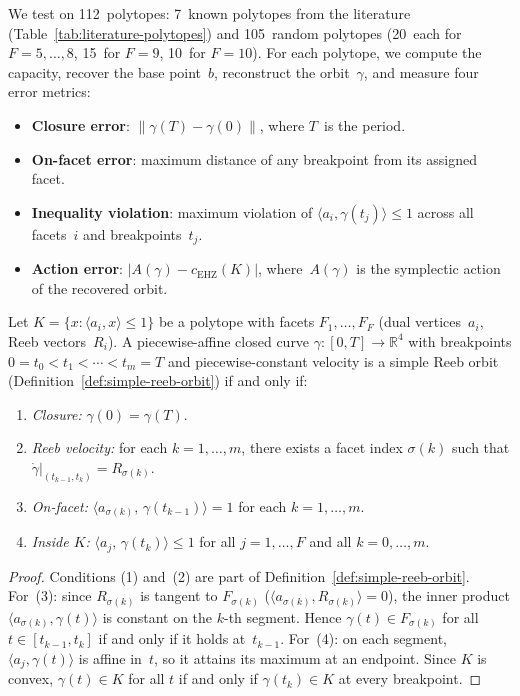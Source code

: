 We test on 112~polytopes: 7~known polytopes from the literature
(Table~\ref{tab:literature-polytopes}) and 105~random polytopes
(20~each for $F = 5, \ldots, 8$, 15~for $F = 9$, 10~for $F = 10$).
For each polytope, we compute the capacity, recover the base
point~$b$, reconstruct the orbit~$\gamma$, and measure four error
metrics:
\begin{itemize}
  \item \textbf{Closure error}: $\lVert \gamma(T) - \gamma(0) \rVert$,
    where $T$~is the period.
  \item \textbf{On-facet error}: maximum distance of any breakpoint
    from its assigned facet.
  \item \textbf{Inequality violation}: maximum violation of
    $\langle a_i, \gamma(t_j) \rangle \le 1$ across all facets~$i$
    and breakpoints~$t_j$.
  \item \textbf{Action error}: $\lvert A(\gamma) - c_{\mathrm{EHZ}}(K) \rvert$,
    where~$A(\gamma)$ is the symplectic action of the recovered orbit.
\end{itemize}
\begin{lemma}%
\label{lem:finite-orbit-verification}
Let $K = \{x : \langle a_i, x \rangle \le 1\}$ be a polytope with
facets $F_1, \ldots, F_F$ (dual vertices~$a_i$, Reeb vectors~$R_i$).
A piecewise-affine closed curve $\gamma \colon [0, T] \to \mathbb{R}^4$
with breakpoints $0 = t_0 < t_1 < \cdots < t_m = T$ and
piecewise-constant velocity
is a simple Reeb orbit (Definition~\ref{def:simple-reeb-orbit})
if and only if:
\begin{enumerate}
  \item \emph{Closure:}
    $\gamma(0) = \gamma(T)$.
  \item \emph{Reeb velocity:}
    for each $k = 1, \ldots, m$, there exists a facet index
    $\sigma(k)$ such that
    $\dot{\gamma}|_{(t_{k-1}, t_k)} = R_{\sigma(k)}$.
  \item \emph{On-facet:}
    $\langle a_{\sigma(k)},\, \gamma(t_{k-1}) \rangle = 1$
    for each $k = 1, \ldots, m$.
  \item \emph{Inside $K$:}
    $\langle a_j,\, \gamma(t_k) \rangle \le 1$
    for all $j = 1, \ldots, F$ and all $k = 0, \ldots, m$.
\end{enumerate}
\end{lemma}

\begin{proof}
Conditions (1) and~(2) are part of
Definition~\ref{def:simple-reeb-orbit}.
For~(3): since $R_{\sigma(k)}$ is tangent to $F_{\sigma(k)}$
($\langle a_{\sigma(k)}, R_{\sigma(k)} \rangle = 0$),
the inner product
$\langle a_{\sigma(k)}, \gamma(t) \rangle$ is constant on the $k$-th
segment. Hence $\gamma(t) \in F_{\sigma(k)}$ for all
$t \in [t_{k-1}, t_k]$ if and only if it holds at~$t_{k-1}$.
For~(4): on each segment, $\langle a_j, \gamma(t) \rangle$ is
affine in~$t$, so it attains its maximum at an endpoint. Since $K$ is
convex, $\gamma(t) \in K$ for all $t$ if and only if
$\gamma(t_k) \in K$ at every breakpoint.
\end{proof}

